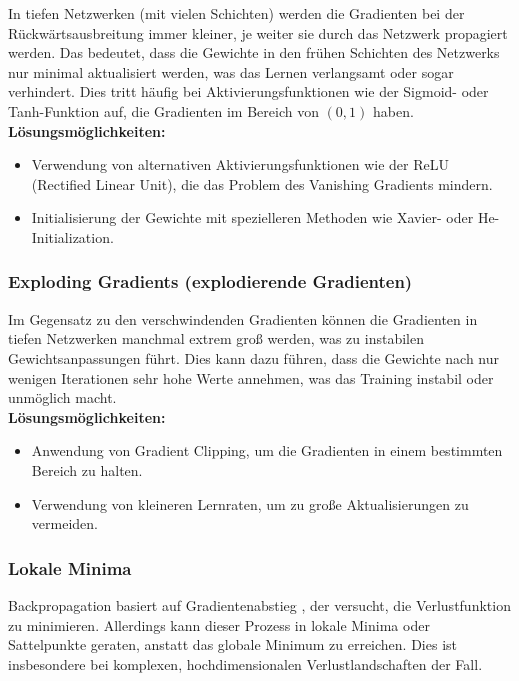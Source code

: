 \documentclass[12pt]{article}
\begin{document}
In tiefen Netzwerken (mit vielen Schichten) werden die Gradienten bei der Rückwärtsausbreitung immer kleiner, je weiter sie durch das Netzwerk propagiert werden. Das bedeutet, dass die Gewichte in den frühen Schichten des Netzwerks nur minimal aktualisiert werden, was das Lernen verlangsamt oder sogar verhindert. Dies tritt häufig bei Aktivierungsfunktionen wie der Sigmoid- oder Tanh-Funktion auf, die Gradienten im Bereich von $(0, 1)$ haben.\\

\textbf{Lösungsmöglichkeiten:}
\begin{itemize}
    \item Verwendung von alternativen Aktivierungsfunktionen wie der ReLU (Rectified Linear Unit), die das Problem des Vanishing Gradients mindern.
    \item Initialisierung der Gewichte mit spezielleren Methoden wie Xavier- oder He-Initialization.
\end{itemize}
%
\subsubsection{Exploding Gradients (explodierende Gradienten)}

Im Gegensatz zu den verschwindenden Gradienten können die Gradienten in tiefen Netzwerken manchmal extrem groß werden, was zu instabilen Gewichtsanpassungen führt. Dies kann dazu führen, dass die Gewichte nach nur wenigen Iterationen sehr hohe Werte annehmen, was das Training instabil oder unmöglich macht.\\

\textbf{Lösungsmöglichkeiten:}
\begin{itemize}
    \item Anwendung von Gradient Clipping, um die Gradienten in einem bestimmten Bereich zu halten.
    \item Verwendung von kleineren Lernraten, um zu große Aktualisierungen zu vermeiden.
\end{itemize}
%
 \subsubsection{Lokale Minima}

Backpropagation basiert auf Gradientenabstieg , der versucht, die Verlustfunktion zu minimieren. Allerdings kann dieser Prozess in lokale Minima oder Sattelpunkte geraten, anstatt das globale Minimum zu erreichen. Dies ist insbesondere bei komplexen, hochdimensionalen Verlustlandschaften der Fall.\\
\end{document}

